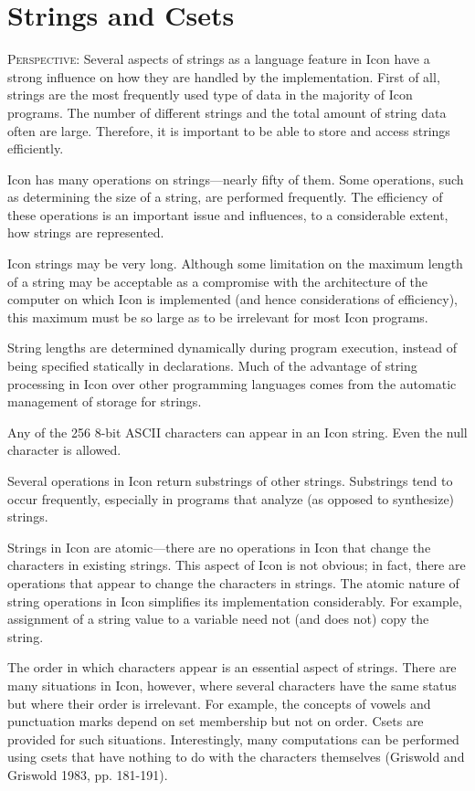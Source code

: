 \chapter{Strings and Csets}

\textsc{Perspective}: Several aspects of strings as a language feature
in Icon have a strong influence on how they are handled by the
implementation. First of all, strings are the most frequently used
type of data in the majority of Icon programs. The number of different
strings and the total amount of string data often are
large. Therefore, it is important to be able to store and access
strings efficiently.

Icon has many operations on strings---nearly fifty of them. Some
operations, such as determining the size of a string, are performed
frequently. The efficiency of these operations is an important issue
and influences, to a considerable extent, how strings are represented.

Icon strings may be very long. Although some limitation on the maximum
length of a string may be acceptable as a compromise with the
architecture of the computer on which Icon is implemented (and hence
considerations of efficiency), this maximum must be so large as to be
irrelevant for most Icon programs.

String lengths are determined dynamically during program execution,
instead of being specified statically in declarations. Much of the
advantage of string processing in Icon over other programming
languages comes from the automatic management of storage for strings.

Any of the 256 8-bit ASCII characters can appear in an Icon
string. Even the {\textquotedbl}null{\textquotedbl} character is
allowed.

Several operations in Icon return substrings of other
strings. Substrings tend to occur frequently, especially in programs
that analyze (as opposed to synthesize) strings.


Strings in Icon are atomic---there are no operations in Icon that
change the characters in existing strings. This aspect of Icon is not
obvious; in fact, there are operations that appear to change the
characters in strings. The atomic nature of string operations in Icon
simplifies its implementation considerably. For example, assignment of
a string value to a variable need not (and does not) copy the string.

The order in which characters appear is an essential aspect of
strings. There are many situations in Icon, however, where several
characters have the same status but where their order is
irrelevant. For example, the concepts of vowels and punctuation marks
depend on set membership but not on order. Csets are provided for such
situations. Interestingly, many computations can be performed using
csets that have nothing to do with the characters themselves (Griswold
and Griswold 1983, pp. 181-191).


